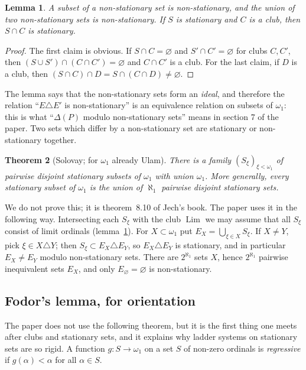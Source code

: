 \documentclass[12pt]{article}
\newtheorem{theorem}{Theorem}[section]
\newtheorem{lemma}[theorem]{Lemma}
\theoremstyle{definition}
\theoremstyle{remark}
\newcommand{\Lim}{\operatorname{Lim}}
\begin{document}
\begin{lemma}\label{NonStationaryIdeal} A subset of a non-stationary set is
    non-stationary, and the union of two non-stationary sets is
    non-stationary. If $S$ is stationary and $C$ is a club, then $S\cap C$ is
    stationary.
\end{lemma}
\begin{proof} The first claim is obvious. If $S\cap C=\varnothing$ and
    $S'\cap C'=\varnothing$ for clubs $C,C'$, then $(S\cup S')\cap(C\cap C')=\varnothing$
    and $C\cap C'$ is a club. For the last claim, if $D$ is a club, then
    $(S\cap C)\cap D=S\cap(C\cap D)\neq\varnothing$.
\end{proof}

The lemma says that the non-stationary sets form an \emph{ideal}, and
therefore the relation ``$E\triangle E'$ is non-stationary'' is an
equivalence relation on subsets of $\omega_1$: this is what ``$\Delta(P)$
modulo non-stationary sets'' means in section 7 of the paper. Two sets which
differ by a non-stationary set are stationary or non-stationary together.

\begin{theorem}[Solovay; for $\omega_1$ already Ulam]\label{Solovay} There
    is a family ${(S_\xi)}_{\xi<\omega_1}$ of pairwise disjoint stationary
    subsets of $\omega_1$ with union $\omega_1$. More generally, every
    stationary subset of $\omega_1$ is the union of $\aleph_1$ pairwise
    disjoint stationary sets.
\end{theorem}

We do not prove this; it is theorem~8.10 of Jech's book. The paper uses it
in the following way. Intersecting each $S_\xi$ with the club $\Lim$ we may
assume that all $S_\xi$ consist of limit ordinals (lemma~\ref{NonStationaryIdeal}).
For $X\subset\omega_1$ put $E_X=\bigcup_{\xi\in X}S_\xi$. If $X\neq Y$, pick
$\xi\in X\triangle Y$; then $S_\xi\subset E_X\triangle E_Y$, so
$E_X\triangle E_Y$ is stationary, and in particular $E_X\neq E_Y$ modulo
non-stationary sets. There are $2^{\aleph_1}$ sets $X$, hence $2^{\aleph_1}$
pairwise inequivalent sets $E_X$, and only $E_\varnothing=\varnothing$ is
non-stationary.

\subsection{Fodor's lemma, for orientation}

The paper does not use the following theorem, but it is the first thing one
meets after clubs and stationary sets, and it explains why ladder systems on
stationary sets are so rigid. A function $g:S\to\omega_1$ on a set $S$ of
non-zero ordinals is \emph{regressive} if $g(\alpha)<\alpha$ for all
$\alpha\in S$.
\end{document}
